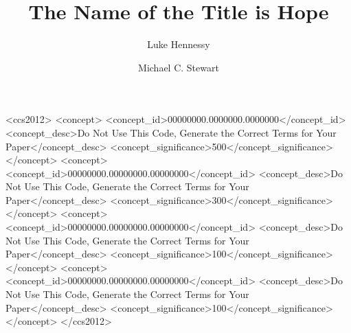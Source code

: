 \documentclass[manuscript,screen,review]{acmart}
\begin{document}
\title{The Name of the Title is Hope}

\author{Luke Hennessy}
\author{Michael C. Stewart}

\renewcommand{\shortauthors}{Trovato and Tobin, et al.}

\begin{abstract}
\end{abstract}

\begin{CCSXML}
<ccs2012>
 <concept>
  <concept_id>00000000.0000000.0000000</concept_id>
  <concept_desc>Do Not Use This Code, Generate the Correct Terms for Your Paper</concept_desc>
  <concept_significance>500</concept_significance>
 </concept>
 <concept>
  <concept_id>00000000.00000000.00000000</concept_id>
  <concept_desc>Do Not Use This Code, Generate the Correct Terms for Your Paper</concept_desc>
  <concept_significance>300</concept_significance>
 </concept>
 <concept>
  <concept_id>00000000.00000000.00000000</concept_id>
  <concept_desc>Do Not Use This Code, Generate the Correct Terms for Your Paper</concept_desc>
  <concept_significance>100</concept_significance>
 </concept>
 <concept>
  <concept_id>00000000.00000000.00000000</concept_id>
  <concept_desc>Do Not Use This Code, Generate the Correct Terms for Your Paper</concept_desc>
  <concept_significance>100</concept_significance>
 </concept>
</ccs2012>
\end{CCSXML}
\end{document}
